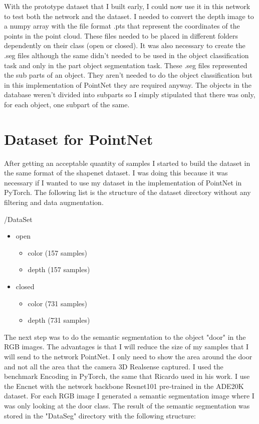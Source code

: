     With the prototype dataset that I built early, I could now use it in this network to test both the network and the dataset. I needed to convert the depth image to a numpy array with the file format .pts that represent the coordinates of the points in the point cloud. These files needed to be placed in different folders dependently on their class (open or closed). 
    It was also necessary to create the .seg files although the same didn't needed to be used in the object classification task and only in the part object segmentation task. These .seg files represented the sub parts of an object. They aren't needed to do the object classification but in this implementation of PointNet they are required anyway. The objects in the database weren't divided into subparts so I simply stipulated that there was only, for each object, one subpart of the same.
    
    \section{Dataset for PointNet}
    
    After getting an acceptable quantity of samples I started to build the dataset in the same format of the shapenet dataset. I was doing this because it was necessary if I wanted to use my dataset in the implementation of PointNet in PyTorch. The following list is the structure of the dataset directory without any filtering and data augmentation.
    \bigskip
    
    /DataSet
    \begin{itemize}
        \item open
        \begin{itemize}
            \item color (157 samples)
            \item depth (157 samples)
        \end{itemize}
        \item closed
        \begin{itemize}
            \item color (731 samples)
            \item depth (731 samples)
        \end{itemize}
    \end{itemize}
    
    The next step was to do the semantic segmentation to the object "door" in the RGB images. The advantages is that I will reduce the size of my samples that I will send to the network PointNet. I only need to show the area around the door and not all the area that the camera 3D Realsense captured. I used the benchmark Encoding in PyTorch, the same that Ricardo used in his work. I use the Encnet with the network backbone Resnet101 pre-trained in the ADE20K dataset. For each RGB image I generated a semantic segmentation image where I was only looking at the door class. The result of the semantic segmentation was stored in the "DataSeg" directory with the following structure:
    \bigskip
    
